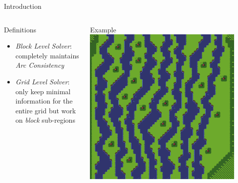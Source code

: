 \documentclass{beamer}
\begin{document}
  \begin{frame}[fragile]{Introduction}
    \begin{columns}[T,onlytextwidth]
        \begin{block}{Definitions}
          \hfill \\
          \begin{itemize}
            \item \textit{Block Level Solver}: \\
              completely maintains \textit{Arc Consistency}
            \item \textit{Grid Level Solver}: \\
              only keep minimal information for the entire grid but
              work on \textit{block} sub-regions
          \end{itemize}
        \end{block}
        \begin{block}{Example}
          \includegraphics[width=0.9\textwidth]{img/forestmicro_64x64.pdf}
        \end{block}
    \end{columns}
  \end{frame}


  
\end{document}
